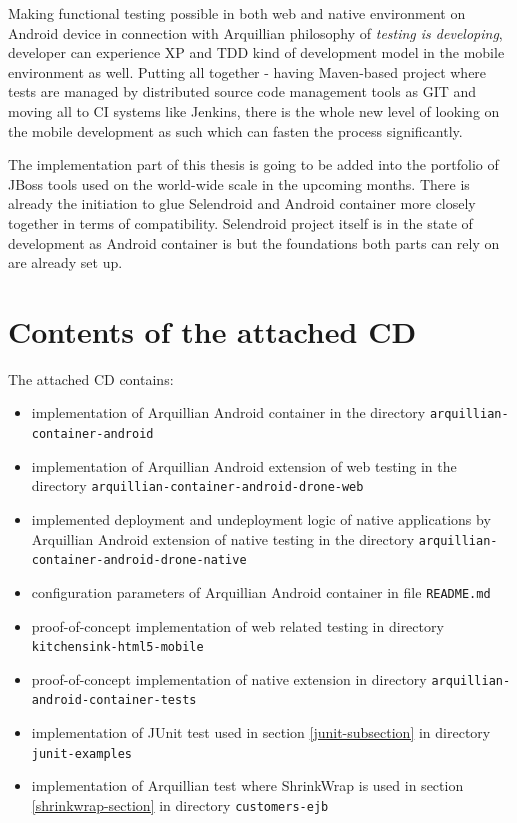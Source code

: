 \documentclass[12pt,final,oneside]{fithesis}
\begin{document}
Making functional testing possible in both web and native environment on Android device in connection with Arquillian philosophy of \textit{testing is developing}, developer can experience XP and TDD kind of development model in the mobile environment as well. Putting all together - having Maven-based project where tests are managed by distributed source code management tools as GIT and moving all to CI systems like Jenkins, there is the whole new level of looking on the mobile development as such which can fasten the process significantly. 

The implementation part of this thesis is going to be added into the portfolio of JBoss tools used on the world-wide scale in the upcoming months. There is already the initiation to glue Selendroid and Android container more closely together in terms of compatibility. Selendroid project itself is in the state of development as Android container is but the foundations both parts can rely on are already set up. 


\begingroup
\raggedright

\endgroup

%
%

\appendix
\chapter{Contents of the attached CD}

The attached CD contains:

\begin{itemize}
\item{implementation of Arquillian Android container in the directory \texttt{arquillian-container-android}}
\item{implementation of Arquillian Android extension of web testing in the directory \texttt{arquillian-container-android-drone-web}}
\item{implemented deployment and undeployment logic of native applications by Arquillian Android extension of native testing in the directory \texttt{arquillian-container-android-drone-native}}
\item{configuration parameters of Arquillian Android container in file \texttt{README.md}}
\item{proof-of-concept implementation of web related testing in directory \texttt{kitchensink-html5-mobile}}
\item{proof-of-concept implementation of native extension in directory \texttt{arquillian-android-container-tests}}
\item{implementation of JUnit test used in section \ref{junit-subsection} in directory \texttt{junit-examples}}
\item{implementation of Arquillian test where ShrinkWrap is used in section \ref{shrinkwrap-section} in directory \texttt{customers-ejb}}
\end{itemize}
\end{document}
